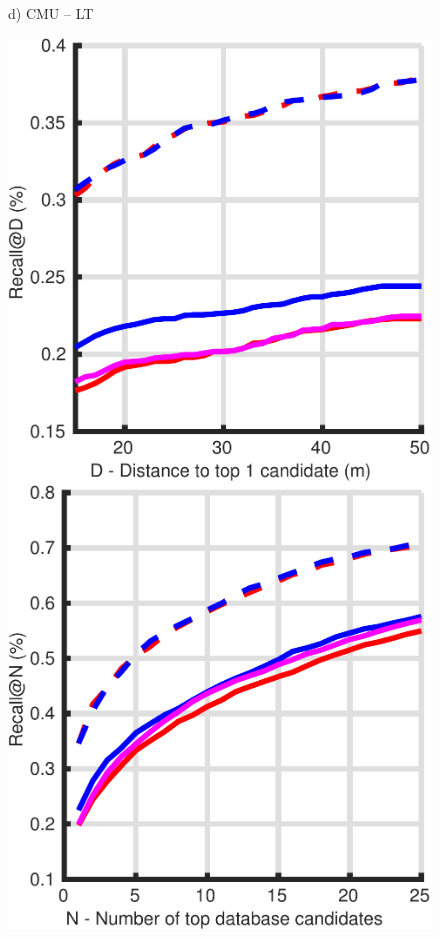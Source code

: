 \begin{figure}
\begin{minipage}{0.16\linewidth}
		d) CMU -- LT
	\end{minipage}
	\begin{minipage}{0.16\linewidth}
		\center \scriptsize
		\includegraphics[width=\linewidth]{plot/oxf_cmu/Results_cmu_snow/distance}	
		
		\includegraphics[width=\linewidth]{plot/oxf_cmu/Results_cmu_snow/recall}
		

\end{minipage}
\end{figure}
